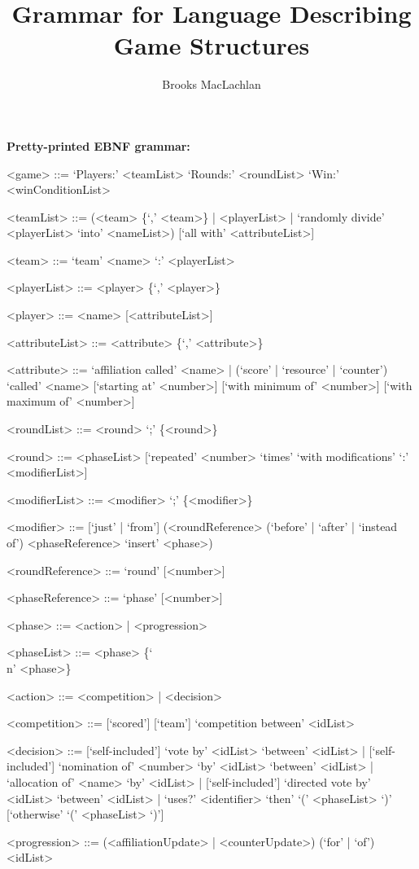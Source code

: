 \documentclass{article}
\title{Grammar for Language Describing Game Structures}
\author{Brooks MacLachlan}
\begin{document}
\maketitle

\noindent \textbf{Pretty-printed EBNF grammar:}
\begin{grammar}
<game> ::= `Players:' <teamList> `Rounds:' <roundList> `Win:' 
<winConditionList>

<teamList> ::= (<team> \{`,' <team>\} | <playerList> | `randomly divide' 
<playerList> `into' <nameList>) [`all with' <attributeList>]

<team> ::= `team' <name> `:' <playerList>

<playerList> ::= <player> \{`,' <player>\}

<player> ::= <name> [<attributeList>]

<attributeList> ::= <attribute> \{`,' <attribute>\}

<attribute> ::= `affiliation called' <name> | (`score' | `resource' | 
`counter') `called'
<name> [`starting at' <number>] [`with minimum of' <number>] [`with maximum of' 
<number>]

<roundList> ::= <round> `;' \{<round>\}

<round> ::= <phaseList> [`repeated' <number> `times' `with modifications' `:' 
<modifierList>]

<modifierList> ::= <modifier> `;' \{<modifier>\}

<modifier> ::= [`just' | `from'] (<roundReference> (`before' | `after' | 
`instead of') 
<phaseReference> `insert' <phase>)

<roundReference> ::= `round' [<number>]

<phaseReference> ::= `phase' [<number>]

<phase> ::= <action> | <progression>

<phaseList> ::= <phase> \{`\\n' <phase>\}

<action> ::= <competition> | <decision>

<competition> ::= [`scored'] [`team'] `competition between' <idList>

<decision> ::= [`self-included'] `vote by' <idList> `between' <idList> | 
[`self-included'] `nomination of' <number> `by' <idList> `between' <idList> 
| `allocation of' <name> `by' <idList> | [`self-included'] `directed vote by' 
<idList> `between' 
<idList> | `uses?' <identifier> `then' `(' <phaseList> `)' [`otherwise' `(' 
<phaseList> `)']

<progression> ::= (<affiliationUpdate> | <counterUpdate>) (`for' | `of') 
<idList>


\end{grammar}
\end{document}
